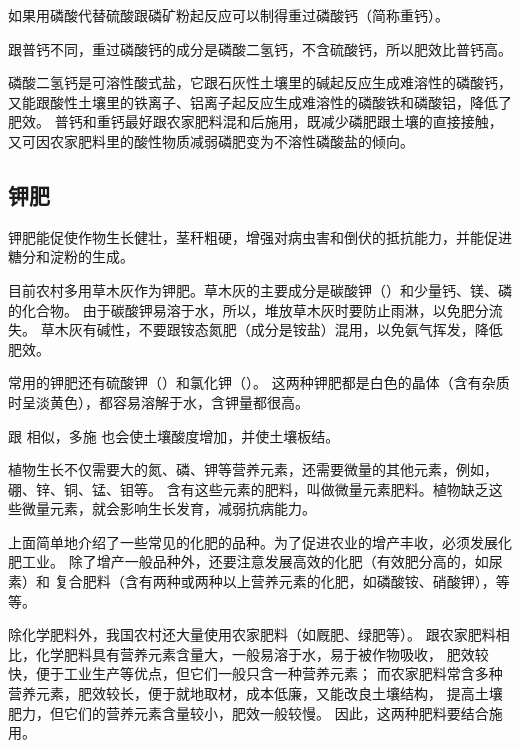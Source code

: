 如果用磷酸代替硫酸跟磷矿粉起反应可以制得重过磷酸钙（简称重钙）。
\begin{fangchengshi}
\end{fangchengshi}

跟普钙不同，重过磷酸钙的成分是磷酸二氢钙，不含硫酸钙，所以肥效比普钙高。

磷酸二氢钙是可溶性酸式盐，它跟石灰性土壤里的碱起反应生成难溶性的磷酸钙，
又能跟酸性土壤里的铁离子、铝离子起反应生成难溶性的磷酸铁和磷酸铝，降低了肥效。
普钙和重钙最好跟农家肥料混和后施用，既减少磷肥跟土壤的直接接触，
又可因农家肥料里的酸性物质减弱磷肥变为不溶性磷酸盐的倾向。



\subsection{钾肥}

钾肥能促使作物生长健壮，茎秆粗硬，增强对病虫害和倒伏的抵抗能力，并能促进糖分和淀粉的生成。

目前农村多用草木灰作为钾肥。草木灰的主要成分是碳酸钾（）和少量钙、镁、磷的化合物。
由于碳酸钾易溶于水，所以，堆放草木灰时要防止雨淋，以免肥分流失。
草木灰有碱性，不要跟铵态氮肥（成分是铵盐）混用，以免氨气挥发，降低肥效。

常用的钾肥还有硫酸钾（）和氯化钾（）。
这两种钾肥都是白色的晶体（含有杂质时呈淡黄色），都容易溶解于水，含钾量都很高。

跟  相似，多施  也会使土壤酸度增加，并使土壤板结。

植物生长不仅需要大的氮、磷、钾等营养元素，还需要微量的其他元素，例如，硼、锌、铜、锰、钼等。
含有这些元素的肥料，叫做微量元素肥料。植物缺乏这些微量元素，就会影响生长发育，减弱抗病能力。

上面简单地介绍了一些常见的化肥的品种。为了促进农业的增产丰收，必须发展化肥工业。
除了增产一般品种外，还要注意发展高效的化肥（有效肥分高的，如尿素）和
复合肥料（含有两种或两种以上营养元素的化肥，如磷酸铵、硝酸钾），等等。

除化学肥料外，我国农村还大量使用农家肥料（如厩肥、绿肥等）。
跟农家肥料相比，化学肥料具有营养元素含量大，一般易溶于水，易于被作物吸收，
肥效较快，便于工业生产等优点，但它们一般只含一种营养元素；
而农家肥料常含多种营养元素，肥效较长，便于就地取材，成本低廉，又能改良土壤结构，
提高土壤肥力，但它们的营养元素含量较小，肥效一般较慢。
因此，这两种肥料要结合施用。


